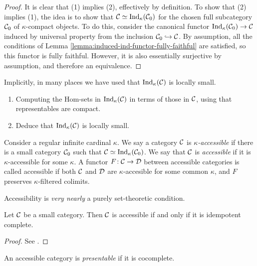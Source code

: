 \begin{proof}
It is clear that (1) implies (2), effectively by definition. To show that (2) implies (1), the idea is to show that \(\mathcal{C}\simeq\operatorname{Ind}_\kappa(\mathcal{C}_0)\) for the chosen full subcategory \(\mathcal{C}_0\) of \(\kappa\)-compact
objects. To do this, consider the canonical functor \(\operatorname{Ind}_\kappa(\mathcal{C}_0)\to\mathcal{C}\) induced by universal property from the inclusion \(\mathcal{C}_0\hookrightarrow\mathcal{C}\). By assumption, all the
conditions of Lemma \ref{lemma:induced-ind-functor-fully-faithful} are satisfied, so this functor is fully faithful. However, it is also essentially surjective by assumption, and therefore
an equivalence.
\end{proof}
\begin{exercise}
	Implicitly, in many places we have used that \(\operatorname{Ind}_\kappa(\mathcal{C})\) is locally small.
	\begin{enumerate}[label=(\arabic*)]
	\item Computing the Hom-sets in \(\operatorname{Ind}_\kappa(\mathcal{C})\) in terms of those in \(\mathcal{C}\), using that representables are compact.
	\item Deduce that \(\operatorname{Ind}_\kappa(\mathcal{C})\) is locally small.
	\end{enumerate}
\end{exercise}
\begin{definition}
	Consider a regular infinite cardinal \(\kappa\). We say a category \(\mathcal{C}\) is \(\kappa\)\emph{-accessible} if there is a small category \(\mathcal{C}_0\) such that \(\mathcal{C}\simeq\operatorname{Ind}_\kappa(\mathcal{C}_0)\).
	We say that \(\mathcal{C}\) is \emph{accessible} if it is \(\kappa\)-accessible for some \(\kappa\). A functor \(F\!:\mathcal{C}\to\mathcal{D}\) between accessible categories is called accessible
	if both \(\mathcal{C}\) and \(\mathcal{D}\) are \(\kappa\)-accesible for some common \(\kappa\), and \(F\) preserves \(\kappa\)-filtered colimits.
\end{definition}

Accessibility is \emph{very nearly} a purely set-theoretic condition.
\begin{proposition}
	Let \(\mathcal{C}\) be a small category. Then \(\mathcal{C}\) is accessible if and only if it is idempotent complete.
\end{proposition}
\begin{proof}
See \cite[Prop.\ 2.2.1 \& Thm.\ 2.2.2]{makkai-pare-accessible-categories}.
\end{proof}

\begin{definition}
	An accessible category is \emph{presentable} if it is cocomplete.
\end{definition}

